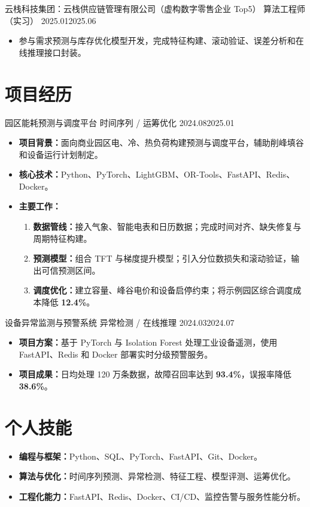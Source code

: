 \documentclass{claritycv}
\begin{document}
\resumeentry
  {云栈科技集团：云栈供应链管理有限公司（虚构数字零售企业 Top5）}
  {算法工程师（实习）}
  {2025.01}{2025.06}
\begin{itemize}
  \item 参与需求预测与库存优化模型开发，完成特征构建、滚动验证、误差分析和在线推理接口封装。
\end{itemize}

\section{项目经历}

\resumeentry
  {园区能耗预测与调度平台}
  {时间序列 / 运筹优化}
  {2024.08}{2025.01}
\begin{itemize}
  \item \textbf{项目背景：}面向商业园区电、冷、热负荷构建预测与调度平台，辅助削峰填谷和设备运行计划制定。
  \item \textbf{核心技术：}Python、PyTorch、LightGBM、OR-Tools、FastAPI、Redis、Docker。
  \item \textbf{主要工作：}
    \begin{enumerate}
      \item \textbf{数据管线：}接入气象、智能电表和日历数据；完成时间对齐、缺失修复与周期特征构建。
      \item \textbf{预测模型：}组合 TFT 与梯度提升模型；引入分位数损失和滚动验证，输出可信预测区间。
      \item \textbf{调度优化：}建立容量、峰谷电价和设备启停约束；将示例园区综合调度成本降低 \textcolor{ResumeAccent}{\textbf{12.4\%}}。
    \end{enumerate}
\end{itemize}

\resumeentry
  {设备异常监测与预警系统}
  {异常检测 / 在线推理}
  {2024.03}{2024.07}
\begin{itemize}
  \item \textbf{项目方案：}基于 PyTorch 与 Isolation Forest 处理工业设备遥测，使用 FastAPI、Redis 和 Docker 部署实时分级预警服务。
  \item \textbf{项目成果：}日均处理 120 万条数据，故障召回率达到 \textcolor{ResumeAccent}{\textbf{93.4\%}}，误报率降低 \textcolor{ResumeAccent}{\textbf{38.6\%}}。
\end{itemize}

\section{个人技能}
\begin{itemize}
  \item \textbf{编程与框架：}Python、SQL、PyTorch、FastAPI、Git、Docker。
  \item \textbf{算法与优化：}时间序列预测、异常检测、特征工程、模型评测、运筹优化。
  \item \textbf{工程化能力：}FastAPI、Redis、Docker、CI/CD、监控告警与服务性能分析。
\end{itemize}
\end{document}

